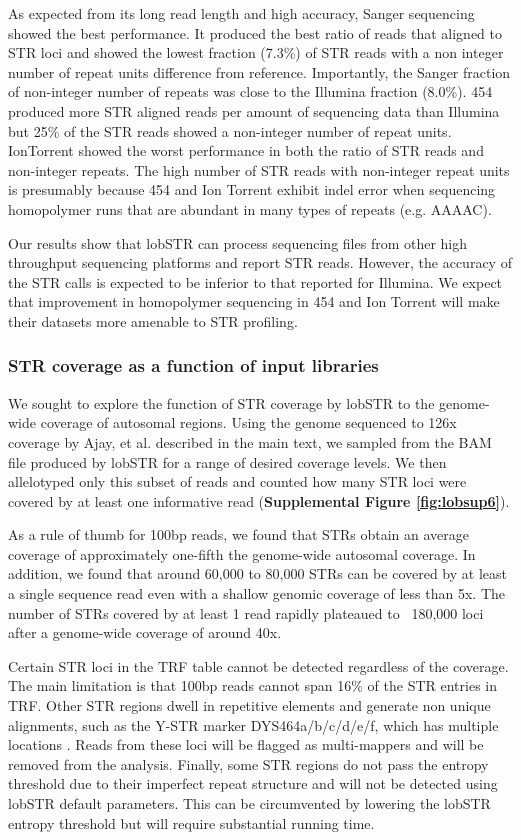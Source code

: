 As expected from its long read length and high accuracy, Sanger sequencing showed the best performance. It produced the best ratio of reads that aligned to STR loci and showed the lowest fraction (7.3\%) of STR reads with a non integer number of repeat units difference from reference. Importantly, the Sanger fraction of non-integer number of repeats was close to the Illumina fraction (8.0\%). 454 produced more STR aligned reads per amount of sequencing data than Illumina but 25\% of the STR reads showed a non-integer number of repeat units. IonTorrent showed the worst performance in both the ratio of STR reads and non-integer repeats.  The high number of STR reads with non-integer repeat units is presumably because 454 and Ion Torrent exhibit indel error when sequencing homopolymer runs that are abundant in many types of repeats (e.g. AAAAC).

Our results show that lobSTR can process sequencing files from other high throughput sequencing platforms and report STR reads. However, the accuracy of the STR calls is expected to be inferior to that reported for Illumina. We expect that improvement in homopolymer sequencing in 454 and Ion Torrent will make their datasets more amenable to STR profiling. 

\subsubsection{STR coverage as a function of input libraries}
We sought to explore the function of STR coverage by lobSTR to the genome-wide coverage of autosomal regions. Using the genome sequenced to 126x coverage by Ajay, et al. \cite{AjayParkerAbaanEtAl2011} described in the main text, we sampled from the BAM file produced by lobSTR for a range of desired coverage levels. We then allelotyped only this subset of reads and counted how many STR loci were covered by at least one informative read (\textbf{Supplemental Figure \ref{fig:lobsup6}}).

As a rule of thumb for 100bp reads, we found that STRs obtain an average coverage of approximately one-fifth the genome-wide autosomal coverage. In addition, we found that around 60,000 to 80,000 STRs can be covered by at least a single sequence read even with a shallow genomic coverage of less than 5x. The number of STRs covered by at least 1 read rapidly plateaued to ~180,000 loci after a genome-wide coverage of around 40x. 

Certain STR loci in the TRF table cannot be detected regardless of the coverage. The main limitation is that 100bp reads cannot span 16\% of the STR entries in TRF. Other STR regions dwell in repetitive elements and generate non unique alignments, such as the Y-STR marker DYS464a/b/c/d/e/f, which has multiple locations \cite{KehdyPena2010}. Reads from these loci will be flagged as multi-mappers and will be removed from the analysis. Finally, some STR regions do not pass the entropy threshold due to their imperfect repeat structure and will not be detected using lobSTR default parameters. This can be circumvented by lowering the lobSTR entropy threshold but will require substantial running time.

